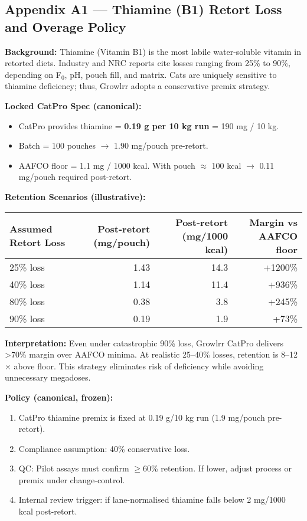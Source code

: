 \subsection*{Appendix A1 --- Thiamine (B1) Retort Loss and Overage Policy\cite{ref7}}

\textbf{Background:}  
Thiamine (Vitamin B1) is the most labile water-soluble vitamin in retorted diets. Industry and NRC reports cite losses ranging from 25\% to 90\%, depending on F$_0$, pH, pouch fill, and matrix. Cats are uniquely sensitive to thiamine deficiency; thus, Growlrr adopts a conservative premix strategy.

\textbf{Locked CatPro Spec (canonical):}  
\begin{itemize}[leftmargin=1.2em]
  \item CatPro provides thiamine = \textbf{0.19 g per 10 kg run} = 190 mg / 10 kg.
  \item Batch = 100 pouches $\rightarrow$ 1.90 mg/pouch pre-retort.
  \item AAFCO floor = 1.1 mg / 1000 kcal. With pouch $\approx$ 100 kcal $\rightarrow$ 0.11 mg/pouch required post-retort.
\end{itemize}

\textbf{Retention Scenarios (illustrative):}

\begin{tabular}{lrrr}
\toprule
Assumed Retort Loss & Post-retort (mg/pouch) & Post-retort (mg/1000 kcal) & Margin vs AAFCO floor \\
\midrule
25\% loss & 1.43 & 14.3 & +1200\% \\
40\% loss & 1.14 & 11.4 & +936\% \\
80\% loss & 0.38 & 3.8 & +245\% \\
90\% loss & 0.19 & 1.9 & +73\% \\
\bottomrule
\end{tabular}

\textbf{Interpretation:}  
Even under catastrophic 90\% loss, Growlrr CatPro delivers \textgreater 70\% margin over AAFCO minima. At realistic 25--40\% losses, retention is 8--12$\times$ above floor. This strategy eliminates risk of deficiency while avoiding unnecessary megadoses.

\textbf{Policy (canonical, frozen):}
\begin{enumerate}[leftmargin=1.2em]
  \item CatPro thiamine premix is fixed at 0.19 g/10 kg run (1.9 mg/pouch pre-retort).  
  \item Compliance assumption: 40\% conservative loss.  
  \item QC: Pilot assays must confirm $\geq$60\% retention. If lower, adjust process or premix under change-control.  
  \item Internal review trigger: if lane-normalised thiamine falls below 2 mg/1000 kcal post-retort.  
\end{enumerate}

